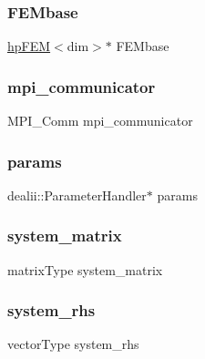 \subsubsection{\texorpdfstring{F\+E\+Mbase}{FEMbase}}
{\footnotesize\ttfamily \mbox{\hyperlink{classhp_f_e_m}{hp\+F\+EM}}$<$dim$>$$\ast$ F\+E\+Mbase}

\mbox{\label{classsolve_class_a03728ed636ca889ae407c84d181bc611}} 
\subsubsection{\texorpdfstring{mpi\+\_\+communicator}{mpi\_communicator}}
{\footnotesize\ttfamily M\+P\+I\+\_\+\+Comm mpi\+\_\+communicator}

\mbox{\label{classsolve_class_accca5aede13ea52f0c11dff4daf1ad97}} 
\subsubsection{\texorpdfstring{params}{params}}
{\footnotesize\ttfamily dealii\+::\+Parameter\+Handler$\ast$ params}

\mbox{\label{classsolve_class_a56f7357eb335f9ce4ac30bc30d7513e8}} 
\subsubsection{\texorpdfstring{system\+\_\+matrix}{system\_matrix}}
{\footnotesize\ttfamily matrix\+Type system\+\_\+matrix}

\mbox{\label{classsolve_class_a6c39fa839fdc40d2408946617a778571}} 
\subsubsection{\texorpdfstring{system\+\_\+rhs}{system\_rhs}}
{\footnotesize\ttfamily vector\+Type system\+\_\+rhs}



